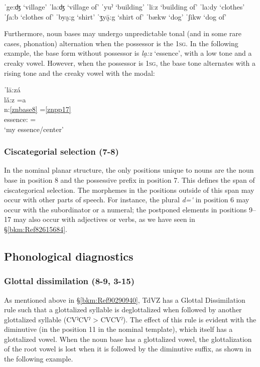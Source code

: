 \documentclass[output=paper]{langscibook}
\begin{document}
\ea \ea ˈge:ʤ `village' 
    \ex ˈla:ʤ `village of' 
    \z 
\ex\label{bkm:Ref106284921}
    \ea ˈyuˀ `building' 
    \ex ˈli:z `building of' 
    \z
\ex\label{bkm:Ref106284922}
    \ea ˈla:dy `clothes'  
    \ex ˈʃa:b `clothes of'
    \z
\ex \ea ˈbya̰:g `shirt' 
    \ex  ˈʒyā̰:g `shirt of'
    \z
\ex \ea  ˈbækw `dog' 
    \ex ˈʃikw `dog of' 
    \z 
\z

Furthermore, noun bases may undergo unpredictable tonal (and in some rare cases, phonation) alternation when the possessor is the 1\textsc{sg}. In the following example, the base form without possessor is \textit{la̰:z} `essence', with a low tone and a creaky vowel. However, when the possessor is \textsc{1sg}, the base tone alternates with a rising tone and the creaky vowel with the modal:

\ea\label{ex:key:zap:116}
{ˈlā:zá}\\
\glll lǎ:z =a\\
n:\ref{znbase8}  =\ref{znpp17}\\
essence:\First\Sg{} =\First\Sg{}\\
\glt `my essence/center'
\z

\subsubsection{Ciscategorial selection (7-8)}

In the nominal planar structure, the only positions unique to nouns are the noun base in position 8 and the possessive prefix in position 7. This defines the span of ciscategorical selection. The morphemes in the positions outside of this span may occur with other parts of speech. For instance, the plural \textit{d=\'{} } in position 6 may occur with the subordinator or a numeral; the postponed elements in positions 9--17 may also occur with adjectives or verbs, as we have seen in §\ref{bkm:Ref82615684}.

\subsection{Phonological diagnostics}
\subsubsection{Glottal dissimilation (8-9, 3-15)} \label{bkm:Ref83823350}
As mentioned above in §\ref{bkm:Ref90290940}, TdVZ has a Glottal Dissimilation rule such that a glottalized syllable is deglottalized when followed by another glottalized syllable (CVˀCVˀ > CVCVˀ). The effect of this rule is evident with the diminutive (in the position 11 in the nominal template), which itself has a glottalized vowel. When the noun base has a glottalized vowel, the glottalization of the root vowel is lost when it is followed by the diminutive suffix, as shown in the following example.
\end{document}

